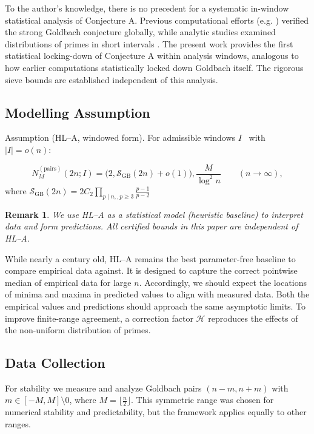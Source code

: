 \documentclass[11pt]{article}
\theoremstyle{inline}
\newtheorem*{remark}{Remark}
\theoremstyle{break}
\theoremstyle{break}
\theoremstyle{break}
\theoremstyle{break}
\theoremstyle{break}
\theoremstyle{inline}
\newcommand{\SGB}{\mathcal{S}_{\scriptscriptstyle\mathrm{GB}}}
\newcommand{\HLCorr}{\mathcal{H}}
\begin{document}
To the author’s knowledge, there is no precedent for a systematic in-window statistical analysis of Conjecture A. Previous computational efforts (e.g. \cite{OliveiraESilva2014}) verified the strong Goldbach conjecture globally, while analytic studies examined distributions of primes in short intervals \cite{MontgomerySoundararajan2004,GranvilleSoundararajan2007}. The present work provides the first statistical locking-down of Conjecture A within analysis windows, analogous to how earlier computations statistically locked down Goldbach itself.  The rigorous sieve bounds are established independent of this analysis.

\subsection*{Modelling Assumption}
Assumption (HL–A, windowed form). For admissible windows \( I \)  with \( \lvert I \rvert = o(n) \):

\begin{equation}
N_M^{(\mathrm{pairs})}(2n;I)  = \Big(2,\SGB(2n) + o(1)\Big),\frac{M}{\log^2 n}
\qquad(n\to\infty),
\end{equation}
where \( \SGB(2n) = 2C_2\prod_{p\mid n,,p\ge3} \frac{p-1}{p-2} \)

\begin{remark}
We use HL–A as a statistical model (heuristic baseline) to interpret data and form predictions. All certified bounds in this paper are independent of HL–A.
\end{remark}

While nearly a century old, HL–A remains the best parameter-free baseline to compare empirical data against. It is designed to capture the correct pointwise median of empirical data for large \( n \). Accordingly, we should expect the locations of minima and maxima in predicted values to align with measured data. Both the empirical values and predictions should approach the same asymptotic limits. To improve finite-range agreement, a correction factor \( \HLCorr \) reproduces the effects of the non-uniform distribution of primes.


\subsection*{Data Collection}

For stability we measure and analyze Goldbach pairs \( (n-m, n+m) \) with \( m \in [-M,M] \setminus{0} \), where \( M=\lfloor \frac{n}{2} \rfloor \). This symmetric range was chosen for numerical stability and predictability, but the framework applies equally to other ranges.
\end{document}
